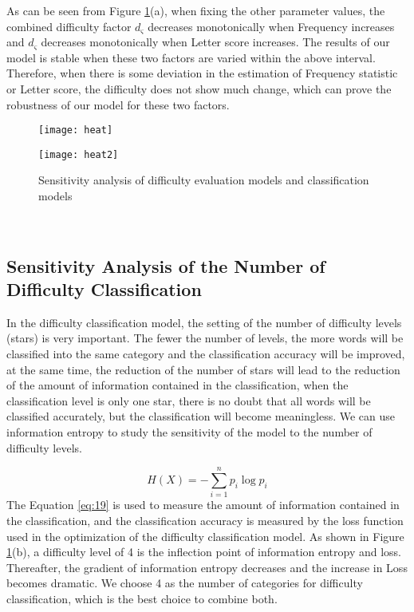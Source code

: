 \documentclass[12pt]{mcmthesis}
\begin{document}
As can be seen from Figure \ref{fig:16}(a), when fixing the other parameter values, the combined difficulty factor $ d_{\varsigma} $ decreases monotonically when Frequency increases and $ d_{\varsigma} $ decreases monotonically when Letter score increases. The results of our model is stable when these two factors are varied within the above interval. Therefore, when there is some deviation in the estimation of Frequency statistic or Letter score, the difficulty does not show much change, which can prove the robustness of our model for these two factors.
\begin{figure}[h]
	\centering
	\begin{minipage}[c]{0.5\textwidth}
		\centering
		\texttt{[image: heat]}
		\label{fig16_1}
	\end{minipage}
	\quad
	\begin{minipage}[c]{0.46\textwidth}
		\centering
		\texttt{[image: heat2]}
		\label{fig16_2}
	\end{minipage}
	\caption{Sensitivity analysis of difficulty evaluation models and classification models}
	\label{fig:16}
\end{figure}
\\[0.01pt]
\subsection{Sensitivity Analysis of the Number of Difficulty Classification}
\hspace{1.4em}In the difficulty classification model, the setting of the number of difficulty levels (stars) is very important. The fewer the number of levels, the more words will be classified into the same category and the classification accuracy will be improved, at the same time, the reduction of the number of stars will lead to the reduction of the amount of information contained in the classification, when the classification level is only one star, there is no doubt that all words will be classified accurately, but the classification will become meaningless. We can use information entropy to study the sensitivity of the model to the number of difficulty levels.

\begin{equation}\label{eq:19}
	H(X)=-\sum_{i=1}^n p_i \log p_i
\end{equation}
The Equation \ref{eq:19} is used to measure the amount of information contained in the classification, and the classification accuracy is measured by the loss function used in the optimization of the difficulty classification model. As shown in Figure \ref{fig:16}(b), a difficulty level of 4 is the inflection point of information entropy and loss. Thereafter, the gradient of information entropy decreases and the increase in Loss becomes dramatic. We choose 4 as the number of categories for difficulty classification, which is the best choice to combine both.
\\[0.01pt]
\end{document}
